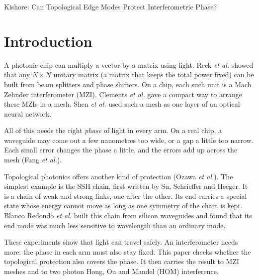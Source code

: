 \documentclass[journal,11pt]{IEEEtran}
\begin{document}
%
{Kishore: Can Topological Edge Modes Protect Interferometric Phase?}

\maketitle


\section{Introduction}
A photonic chip can multiply a vector by a matrix using light. Reck \emph{et al.} showed that any $N\times N$ unitary matrix (a matrix that keeps the total power fixed) can be built from beam splitters and phase shifters. On a chip, each such unit is a Mach Zehnder interferometer (MZI). Clements \emph{et al.} gave a compact way to arrange these MZIs in a mesh. Shen \emph{et al.} used such a mesh as one layer of an optical neural network.

All of this needs the right \emph{phase} of light in every arm. On a real chip, a waveguide may come out a few nanometres too wide, or a gap a little too narrow. Each small error changes the phase a little, and the errors add up across the mesh (Fang \emph{et al.}).

Topological photonics offers another kind of protection (Ozawa \emph{et al.}). The simplest example is the SSH chain, first written by Su, Schrieffer and Heeger. It is a chain of weak and strong links, one after the other. Its end carries a special state whose energy cannot move as long as one symmetry of the chain is kept. Blanco Redondo \emph{et al.} built this chain from silicon waveguides and found that its end mode was much less sensitive to wavelength than an ordinary mode.

These experiments show that light can travel safely. An interferometer needs more: the phase in each arm must also stay fixed. This paper checks whether the topological protection also covers the phase. It then carries the result to MZI meshes and to two photon Hong, Ou and Mandel (HOM) interference.

\end{document}
